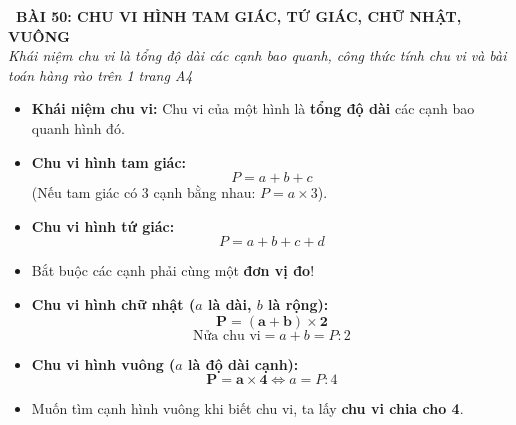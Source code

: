 \documentclass[11pt,a4paper]{article}
\begin{document}
\begin{tcolorbox}[
  enhanced,
  colback=white,
  colframe=primary,
  arc=3mm,
  boxrule=1.2pt,
  left=4mm, right=4mm, top=2.5mm, bottom=2.5mm,
  drop shadow=black!10!white
]
  \centering
  {\Large\bfseries\color{primary}\faBookmark\ BÀI 50: CHU VI HÌNH TAM GIÁC, TỨ GIÁC, CHỮ NHẬT, VUÔNG}\\[1.5mm]
  {\small\itshape\color{black!75}Khái niệm chu vi là tổng độ dài các cạnh bao quanh, công thức tính chu vi và bài toán hàng rào trên 1 trang A4}
\end{tcolorbox}

\vspace{-2mm}


\noindent
\begin{minipage}[t]{0.49\textwidth}\vspace{0pt}
\begin{tcolorbox}[
  enhanced,
  colback=blue!4!white,
  colframe=blue!75!black,
  arc=2mm, boxrule=0.8pt,
  left=2mm, right=2mm, top=1.8mm, bottom=1.8mm,
  title={\footnotesize\bfseries\color{white}\faKey\ 1. Chu vi tam giác và tứ giác}
]
{\footnotesize
\begin{itemize}\setlength{\itemsep}{1.5pt}\setlength{\leftskip}{-2.5mm}
  \item \textbf{Khái niệm chu vi:} Chu vi của một hình là \textbf{tổng độ dài} các cạnh bao quanh hình đó.
  \item \textbf{Chu vi hình tam giác:}
  $$P = a + b + c$$
  (Nếu tam giác có 3 cạnh bằng nhau: $P = a \times 3$).
  \item \textbf{Chu vi hình tứ giác:}
  $$P = a + b + c + d$$
  \item Bắt buộc các cạnh phải cùng một \textbf{đơn vị đo}!
\end{itemize}
}
\end{tcolorbox}
\end{minipage}
\hfill
\begin{minipage}[t]{0.49\textwidth}\vspace{0pt}
\begin{tcolorbox}[
  enhanced,
  colback=teal!4!white,
  colframe=teal!75!black,
  arc=2mm, boxrule=0.8pt,
  left=2mm, right=2mm, top=1.8mm, bottom=1.8mm,
  title={\footnotesize\bfseries\color{white}\faCheckSquare\ 2. Chu vi hình chữ nhật và hình vuông}
]
{\footnotesize
\begin{itemize}\setlength{\itemsep}{1.5pt}\setlength{\leftskip}{-2.5mm}
  \item \textbf{Chu vi hình chữ nhật ($a$ là dài, $b$ là rộng):}
  $$\mathbf{P = (a + b) \times 2}$$
  $$\text{Nửa chu vi} = a + b = P : 2$$
  \item \textbf{Chu vi hình vuông ($a$ là độ dài cạnh):}
  $$\mathbf{P = a \times 4} \iff a = P : 4$$
  \item Muốn tìm cạnh hình vuông khi biết chu vi, ta lấy \textbf{chu vi chia cho 4}.
\end{itemize}
}
\end{tcolorbox}
\end{minipage}
\end{document}
